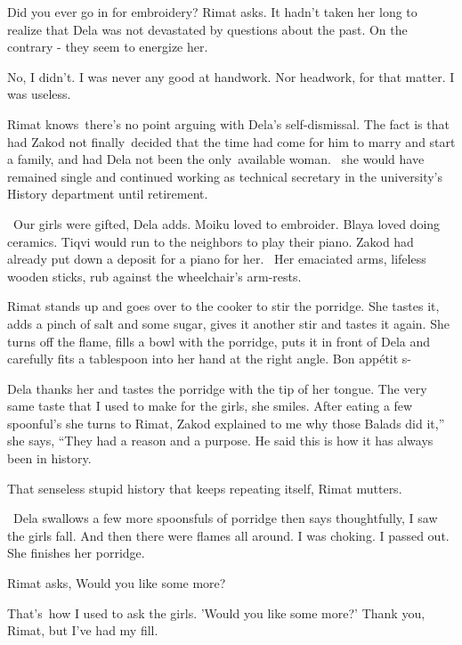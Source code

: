 \documentclass[letterpaper]{article}
\begin{document}
{\textquotedbl}Did you ever go in for embroidery?{\textquotedbl} Rimat asks. It hadn't taken her long to realize that
Dela was not devastated by questions about the past. On the contrary - they seem to energize her. 

{\textquotedbl}No, I didn't. I was never any good at handwork. Nor headwork, for that matter. I was
useless.{\textquotedbl} 

Rimat knows~there's no point arguing with Dela's self-dismissal. The fact is that had Zakod not finally~decided that the
time had come for him to marry and start a family, and had Dela not been the only~available woman. \ she would have
remained single and continued working as technical secretary in the university's History department until retirement.

~{\textquotedbl}Our girls were gifted,{\textquotedbl} Dela adds. {\textquotedbl}Moiku loved to embroider. Blaya loved
doing ceramics. Tiqvi would run to the neighbors to play their piano. Zakod had already put down a deposit for a piano
for her.{\textquotedbl} \ Her emaciated arms, lifeless wooden sticks, rub against the wheelchair's arm-rests. 

Rimat stands up and goes over to the cooker to stir the porridge. She tastes it, adds a pinch of salt and some sugar,
gives it another stir and tastes it again. She turns off the flame, fills a bowl with the porridge, puts it in front of
Dela and carefully fits a tablespoon into her hand at the right angle. {\textquotedbl}Bon app\'etit s-{\textquotedbl} 

Dela thanks her and tastes the porridge with the tip of her tongue. {\textquotedbl}The very same taste that I used to
make for the girls,{\textquotedbl} she smiles. After eating a few spoonful's she turns to Rimat, {\textquotedbl}Zakod
explained to me why those Balads did it,'' she says, ``They had a reason and a purpose. He said this is how it has
always been in history.{\textquotedbl} 

{\textquotedbl}That senseless stupid history that keeps repeating itself,{\textquotedbl} Rimat mutters.

~Dela swallows a few more spoonsfuls of porridge then says thoughtfully, {\textquotedbl}I saw the girls fall. And then
there were flames all around. I was choking. I passed out.{\textquotedbl} She finishes her porridge. 

Rimat asks, {\textquotedbl}Would you like some more?{\textquotedbl} 

{\textquotedbl}That's~how I used to ask the girls. 'Would you like some more?' Thank you, Rimat, but I've had my
fill.{\textquotedbl} 
\end{document}
